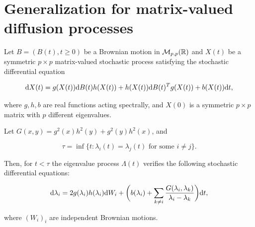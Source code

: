\section{Generalization for matrix-valued diffusion processes} \label{sec:matrix_difusions}

\begin{theorem} \label{thm:diffusion_real}
    Let $B = (B(t), t\ge 0)$ be a Brownian motion in $\mathcal M_{p,p}(\mathbb R)$ and $X(t)$ be a symmetric $p\times p$ matrix-valued stochastic process satisfying the stochastic differential equation

    \begin{equation}
        \mathrm d X(t) = g(X(t)) \mathrm d B(t) h(X(t)) + h(X(t)) \mathrm d B(t)^T g(X(t)) + b(X(t))\mathrm d t, \label{eq:matrix_diffusion}
    \end{equation}

    where $g,h,b$ are real functions acting spectrally, and $X(0)$ is a symmetric $p\times p$ matrix with $p$ different eigenvalues. 

    Let $G(x,y) = g^2(x)h^2(y) + g^2(y)h^2(x)$, and
    
    \begin{equation}
        \tau = \inf\{ t: \lambda_i(t) = \lambda_j(t) \text{ for some } i\neq j \}. \label{eq:collision_time}
    \end{equation} 
    
    Then, for $t < \tau$ the eigenvalue process $\Lambda(t)$ verifies the following stochastic differential equations:

    \begin{equation}
        \mathrm d \lambda_i = 2g(\lambda_i)h(\lambda_i)\mathrm d W_i + \biggl( b(\lambda_i) + \sum_{k\neq i} \frac{G(\lambda_i,\lambda_k)}{\lambda_i - \lambda_k} \biggr)\mathrm d t, \label{eq:gen_dyson}
    \end{equation}

    \noindent where $(W_i)_{i}$ are independent Brownian motions.
\end{theorem}

